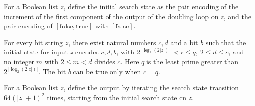 \begin{definition}
\label{Complexity.BinArith.searchInit}
\leanok
{}
For a Boolean list $z$, define the initial search state as the pair encoding of the
increment of the first component of the output of the doubling loop on $z$, and the pair
encoding of $[\mathrm{false},\mathrm{true}]$ with $[\mathrm{false}]$.
\end{definition}

\begin{theorem}
\label{Complexity.BinArith.searchInv_init}
\leanok
{}
For every bit string $z$, there exist natural numbers $c,d$ and a bit $b$ such that the
initial state for input $z$ encodes $c,d,b$, with $2^{\lceil\log_2(2|z|)\rceil}<c\leq
q$, $2\leq d\leq c$, and no integer $m$ with $2\leq m<d$ divides $c$. Here $q$ is the
least prime greater than $2^{\lceil\log_2(2|z|)\rceil}$. The bit $b$ can be true only
when $c=q$.
\end{theorem}

\begin{definition}
\label{Complexity.BinArith.searchLoop}
\leanok
{}
For a Boolean list $z$, define the output by iterating the search state transition
$64(|z|+1)^2$ times, starting from the initial search state on $z$.
\end{definition}

